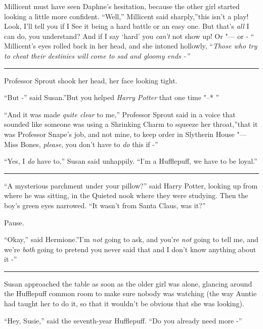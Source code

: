 Millicent must have seen Daphne's hesitation, because the other girl
started looking a little more confident. ``Well,'' Millicent said
sharply,''this isn't a play! Look, I'll tell you if I See it being a
hard battle or an easy one. But that's \emph{all} I can do, you
understand? And if I say `hard' you \emph{can't} not show up! Or "--- or -
`` Millicent's eyes rolled back in her head, and she intoned hollowly,
``\emph{Those who try to cheat their destinies will come to sad and
gloomy ends -''}

\begin{center}\rule{3in}{0.4pt}\end{center}

Professor Sprout shook her head, her face looking tight.

``But -'' said Susan.''But you helped \emph{Harry Potter} that one time
"--* ''

``And it was made \emph{quite clear} to me,'' Professor Sprout said in a
voice that sounded like someone was using a Shrinking Charm to squeeze
her throat,''that it was Professor Snape's job, and not mine, to keep
order in Slytherin House "--- Miss Bones, \emph{please}, you don't have to
\emph{do} this if -''

``Yes, I \emph{do} have to,'' Susan said unhappily. ``I'm a Hufflepuff,
we have to be loyal.''

\begin{center}\rule{3in}{0.4pt}\end{center}

``A mysterious parchment under your pillow?'' said Harry Potter, looking
up from where he was sitting, in the Quieted nook where they were
studying. Then the boy's green eyes narrowed. ``It wasn't from Santa
Claus, was it?''

Pause.

``Okay,'' said Hermione.''I'm \emph{not} going to ask, and you're
\emph{not} going to tell me, and we're \emph{both} going to pretend you
never said that and I don't know anything about it -''

\begin{center}\rule{3in}{0.4pt}\end{center}

Susan approached the table as soon as the older girl was alone, glancing
around the Hufflepuff common room to make sure nobody was watching (the
way Auntie had taught her to do it, so that it wouldn't be obvious that
she was looking).

``Hey, Susie,'' said the seventh-year Hufflepuff. ``Do you already need
more -''

